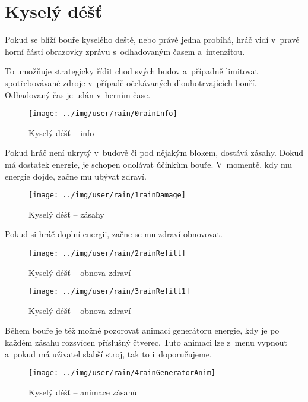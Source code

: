 
\section{Kyselý déšť}

Pokud se blíží bouře kyselého deště, nebo právě jedna probíhá, hráč vidí v~pravé horní části obrazovky zprávu s~odhadovaným časem a~intenzitou.

To umožňuje strategicky řídit chod svých budov a~případně limitovat spotřebovávané zdroje v~případě očekávaných dlouhotrvajících bouří. Odhadovaný čas je udán v~herním čase.

\begin{figure}[!ht]\centering
\texttt{[image: ../img/user/rain/0rainInfo]}

\caption{Kyselý déšť -- info}
\label{fig:user_rain_0rainInfo}

\end{figure}

\FloatBarrier

Pokud hráč není ukrytý v~budově či pod nějakým blokem, dostává zásahy. Dokud má dostatek energie, je schopen odolávat účinkům bouře. V~momentě, kdy mu energie dojde, začne mu ubývat zdraví.


\begin{figure}[!ht]\centering
\texttt{[image: ../img/user/rain/1rainDamage]}

\caption{Kyselý déšť -- zásahy}
\label{fig:user_rain_1rainDamage}

\end{figure}

\FloatBarrier

Pokud si hráč doplní energii, začne se mu zdraví obnovovat.

\begin{figure}[!ht]\centering
\texttt{[image: ../img/user/rain/2rainRefill]}

\caption{Kyselý déšť -- obnova zdraví}
\label{fig:user_rain_2rainRefill}

\end{figure}


\begin{figure}[!ht]\centering
\texttt{[image: ../img/user/rain/3rainRefill1]}

\caption{Kyselý déšť -- obnova zdraví}
\label{fig:user_rain_3rainRefill1}

\end{figure}

\FloatBarrier

Během bouře je též možné pozorovat animaci generátoru energie, kdy je po každém zásahu rozsvícen příslušný čtverec. Tuto animaci lze z~menu vypnout a~pokud má uživatel slabší stroj, tak to i~doporučujeme.

\begin{figure}[!ht]\centering
\texttt{[image: ../img/user/rain/4rainGeneratorAnim]}

\caption{Kyselý déšť -- animace zásahů}
\label{fig:user_rain_4rainGeneratorAnim}

\end{figure}


\FloatBarrier
